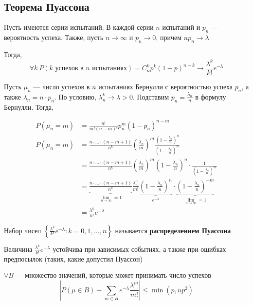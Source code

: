 \documentclass[a4paper, 10pt]{article}
\begin{document}
\subsection{Теорема Пуассона}
\theorem Пусть имеются серии испытаний. В каждой серии $n$ испытаний и $p_n$ — вероятность успеха. Также, пусть $n\rightarrow\infty$ и $p_n\rightarrow0$, причем $np_n\rightarrow\lambda$

Тогда, 
\begin{equation*}
    \forall k\ P(k\text{ успехов в $n$ испытаниях})=C_n^kp^k(1-p)^{n-k}\rightarrow\frac{\lambda^k}{k!}e^{-\lambda}
\end{equation*}

\proof Пусть $\mu_n$ — число успехов в $n$ испытаниях Бернулли с вероятностью успеха $p_n$, а также $\lambda_n=n\cdot p_n$. По условию, $\lambda^k_n\rightarrow\lambda>0$. Подставим $p_n=\displaystyle\frac{\lambda_n}{n}$ в формулу Бернулли. Тогда,

\begin{equation*}
    \begin{aligned}
        P(\mu_n=m)&=\displaystyle\frac{n!}{m!(n-m)!}p_n^m (1-p_n)^{n-m}\\
        P(\mu_n=m)&=\displaystyle\frac{n\cdot\ldots\cdot(n-m+1)}{n^k}\left(\frac{\lambda_n}{m}\right)^m\frac{(1-\frac{\lambda_n}{n})^n}{(1-\frac{\lambda_n}{n})^m}\\
        &=\displaystyle\frac{n\cdot\ldots\cdot(n-m+1)}{n^k}\left(\frac{\lambda_n}{m}\right)^m\left(1-\frac{\lambda_n}{n}\right)^n\cdot\frac{1}{(1-\frac{\lambda_n}{n})^m}\\
        &=\underbrace{\displaystyle\frac{n\cdot\ldots\cdot(n-m+1)}{n^k}}_{\lim\limits_{n\rightarrow\infty}=1}\frac{\lambda_n^m}{m!}\underbrace{\left(1-\frac{\lambda_n}{n}\right)^n}_{e^{-\lambda}}\cdot\underbrace{\left(1-\frac{\lambda_n}{n}\right)^{-m}}_{\lim\limits_{n\rightarrow\infty}=1}\\
        &=\frac{\lambda^k}{k!}e^{-\lambda}
    \end{aligned}
\end{equation*}

 Набор чисел $\left\{\frac{\lambda^k}{k!}e^{-\lambda}\colon k=0,1,\ldots,n\right\}$ называется \textbf{распределением Пуассона}

\comment Величина $\frac{\lambda^k}{k!}e^{-\lambda}$ устойчива при зависимых событиях, а также при ошибках предпосылок (таких, какие допустил Пуассон)

\comment $\forall B$ — множество значений, которые может принимать число успехов
$$\left|P(\mu\in B)-\sum_{m\in B}e^{-\lambda}\frac{\lambda^m}{m!}\right|\leqslant\min{(p,np^2)}$$
\end{document}
